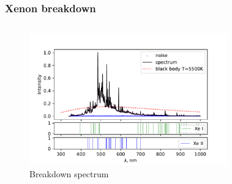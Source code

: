 \documentclass{beamer}
\begin{document}
	\begin{frame}
		\frametitle{Xenon breakdown}
		\begin{columns}
			\begin{figure}
				\centering
				\includegraphics[width=1.1\linewidth]{gen/tirat_xe_lines.pdf}
				\caption*{Breakdown spectrum}
			\end{figure}	
			\begin{figure}
				\centering

\end{figure}
\end{columns}
\end{frame}
\end{document}
